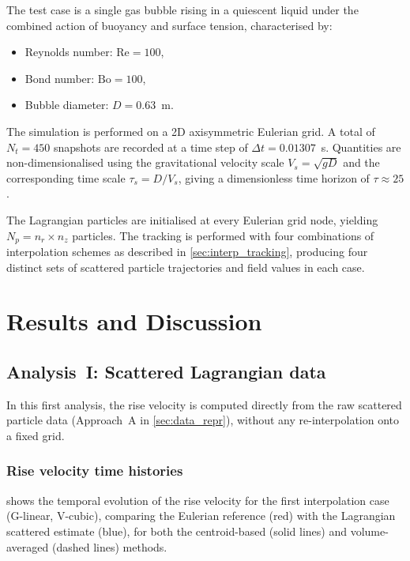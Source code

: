 \documentclass[11pt,a4paper]{article}
\begin{document}
The test case is a single gas bubble rising in a quiescent liquid under the
combined action of buoyancy and surface tension, characterised by:
\begin{itemize}
  \item Reynolds number: $\mathrm{Re} = 100$,
  \item Bond number: $\mathrm{Bo} = 100$,
  \item Bubble diameter: $D = 0.63$~m.
\end{itemize}

The simulation is performed on a 2D axisymmetric Eulerian grid.  A total of
$N_t = 450$ snapshots are recorded at a time step of
$\Delta t = 0.01307$~s.  Quantities are non-dimensionalised using the
gravitational velocity scale $V_s = \sqrt{gD}$ and the corresponding time
scale $\tau_s = D / V_s$, giving a dimensionless time horizon of
$\tau \approx 25$.

The Lagrangian particles are initialised at every Eulerian grid node,
yielding $N_p = n_r \times n_z$ particles.  The tracking is performed with
four combinations of interpolation schemes as described in
\cref{sec:interp_tracking}, producing four distinct sets of scattered
particle trajectories and field values in each case.


\section{Results and Discussion}\label{sec:results}

\subsection{Analysis~I: Scattered Lagrangian data}
\label{sec:results_scattered}

In this first analysis, the rise velocity is computed directly from the raw
scattered particle data (Approach~A in \cref{sec:data_repr}), without any
re-interpolation onto a fixed grid.

\subsubsection{Rise velocity time histories}

 shows the temporal evolution of the rise velocity for
the first interpolation case (G-linear, V-cubic), comparing the Eulerian
reference (red) with the Lagrangian scattered estimate (blue), for both the
centroid-based (solid lines) and volume-averaged (dashed lines) methods.
\end{document}
